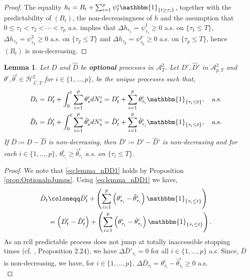 \documentclass[11pt,a4paper]{article}
\numberwithin{equation}{section}
\theoremstyle{newPlain}
\newtheorem{lemma}[theorem]{Lemma}
\theoremstyle{newDefinition}
\theoremstyle{newRemark}
\begin{document}
\begin{appendices}
\begin{proof}
    The equality $h_t = B_t + \sum_{i=1}^p\psi_t^i\mathbbm{1}_{\{t\ge\tau_i\}}$, together with the predictability of $(B_t)$, the non-decreasingness of $h$ and the assumption that $0\le\tau_1<\tau_2<\cdots<\tau_p$ a.s. implies that $\Delta h_{\tau_1}=\psi_{\tau_1}^1\ge0$ a.s. on $\{\tau_1\le T\}$, $\Delta h_{\tau_2}=\psi_{\tau_2}^2\ge0$ a.s. on $\{\tau_2\le T\}$ and $\Delta h_{\tau_p}=\psi_{\tau_p}^p\ge0$ a.s. on $\{\tau_p\le T\}$, hence $(B_t)$ is non-decreasing.
\end{proof}

\begin{lemma}\label{lemma:nonDecreasingDecompositions}
	Let $D$ and $\hat{D}$ be \textbf{optional} processes in $\mathcal{A}_T^2$. Let $D',\hat{D}'$ in $\mathcal{A}_{p,T}^2$ and $\theta^i,\hat{\theta}^i\in\mathcal{H}_{\lambda^i,T}^2$ for $i\in\{1,\ldots,p\}$, be the unique processes such that,
\begin{align}\label{eq:lemma_nDD1}
	\begin{aligned}
		D_t = D_t' + \int_0^t\sum_{i=1}^p\theta_s^idN_s^i = D_t' + \sum_{i=1}^p\theta_{\tau_i}^i\mathbbm{1}_{\{\tau_i\le t\}},\quad\text{a.s.}\\
		\hat{D}_t = \hat{D}_t' + \int_0^t\sum_{i=1}^p\hat{\theta}_s^idN_s^i = \hat{D}_t' + \sum_{i=1}^p\hat{\theta}_{\tau_i}^i\mathbbm{1}_{\{\tau_i\le t\}},\quad\text{a.s.}
	\end{aligned}
\end{align}
If  $\bar{D}\coloneqq D - \hat{D}$ is non-decreasing, then $\bar{D}'\coloneqq D'-\hat{D}'$ is non-decreasing and for each $i\in\{1,\ldots,p\}$, $\theta_{\tau_i}^i\ge\hat{\theta}_{\tau_i}^i$ a.s. on $\{\tau_i\le T\}$.
\end{lemma}
\begin{proof}
	We note that \eqref{eq:lemma_nDD1} holds by Proposition \ref{prop:OptionalpJumps}. Using \eqref{eq:lemma_nDD1} we have,
\begin{align}\label{eq:lemma_nDD2}
	\begin{aligned}
	\bar{D}_t&\coloneqq \bar{D}_t' + \left(\sum_{i=1}^p\left(\theta_{\tau_i}^i-\hat{\theta}_{\tau_i}^i\right)\mathbbm{1}_{\{\tau_i\le t\}}\right)\\ 
	&=\left(D_t' - \hat{D}_t'\right) + \left(\sum_{i=1}^p\left(\theta_{\tau_i}^i-\hat{\theta}_{\tau_i}^i\right)\mathbbm{1}_{\{\tau_i\le t\}}\right).
	\end{aligned}
\end{align}
As an rcll predictable process does  not jump at totally inaccessible stopping times (cf. \cite{jacod2013limit}, Proposition 2.24), we have  $\Delta \bar{D}'_{\tau_i}=0$ for all $i\in\{1,\ldots,p\}$ a.s. Since, $\bar{D}$ is non-decreasing,  we have, for $i\in\{1,\ldots,p\}$,  $\Delta\bar{D}_{\tau_i} = \theta_{\tau_i}^i-\hat{\theta}_{\tau_i}^i\ge0$ a.s.\\

\end{proof}
\end{appendices}
\end{document}
